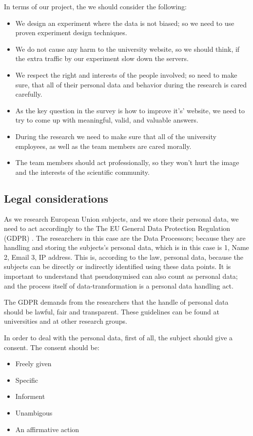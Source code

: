 \documentclass[12pt,a4paper,paper=a4,oneside,titlepage,pdftex]{scrartcl}
\begin{document}
In terms of our project, the we should consider the following:
\begin{itemize}
	\item We design an experiment where the data is not biased; so we need to use proven experiment design techniques.
	\item We do not cause any harm to the university website, so we should think, if the extra traffic by our experiment slow down the servers.
	\item We respect the right and interests of the people involved; so need to make sure, that all of their personal data and behavior during the research is cared carefully.
	\item As the key question in the survey is how to improve it's' website, we need to try to come up with meaningful, valid, and valuable answers.
	\item During the research we need to make sure that all of the university employees, as well as the team members are cared morally.
	\item The team members should act professionally, so they won't hurt the image and the interests of the scientific community.
\end{itemize}

\subsection{Legal considerations}

As we research European Union subjects, and we store their personal data, we need to act accordingly to the The EU General Data Protection Regulation (GDPR) \cite{voigt2017eu}. The researchers in this case are the Data Processors; because they are handling and storing the subjects's personal data, which is in this case is 1, Name 2, Email 3, IP address. This is, according to the law, personal data, because the subjects can be directly or indirectly identified using these data points. It is important to understand that pseudonymised can also count as personal data; and the process itself of data-transformation is a personal data handling act.

The GDPR demands from the researchers that the handle of personal data should be lawful, fair and transparent. These guidelines can be found at universities and at other research groups.

In order to deal with the personal data, first of all, the subject should give a consent. The consent should be:
\begin{itemize}
	\item Freely given
	\item Specific
	\item Informent
	\item Unambigous
	\item An affirmative action	
\end{itemize}
\end{document}
